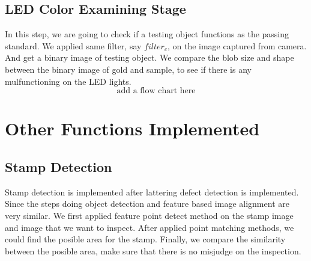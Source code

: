 	\subsection{LED Color Examining Stage}
		In this step, we are going to check if a testing object functions as the passing standard.
		We applied same filter, say $filter_c$, on the image captured from camera. And get a binary image of testing object.
		We compare the blob size and shape between the binary image of gold and sample, to see if there is any mulfunctioning on the LED lights.
		$$ \textrm{add a flow chart here} $$

\section{Other Functions Implemented}
	\subsection{Stamp Detection}
		Stamp detection is implemented after lattering defect detection is implemented.
		Since the steps doing object detection and feature based image alignment are very similar.
		We first applied feature point detect method on the stamp image and image that we want to inspect.
		After applied point matching methods, we could find the posible area for the stamp.
		Finally, we compare the similarity between the posible area, make sure that there is no misjudge on the inspection.